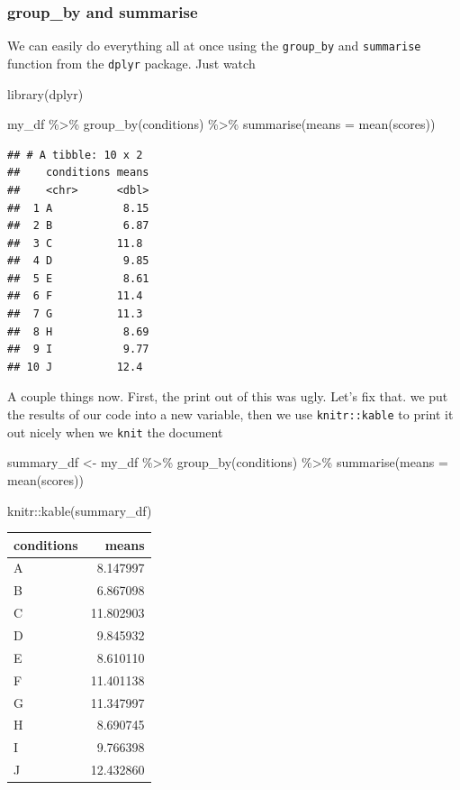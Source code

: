 \documentclass[
]{book}
\newenvironment{Shaded}{\begin{snugshade}}{\end{snugshade}}
\newcommand{\AttributeTok}[1]{\textcolor[rgb]{0.77,0.63,0.00}{#1}}
\newcommand{\FunctionTok}[1]{\textcolor[rgb]{0.00,0.00,0.00}{#1}}
\newcommand{\NormalTok}[1]{#1}
\newcommand{\OtherTok}[1]{\textcolor[rgb]{0.56,0.35,0.01}{#1}}
\newcommand{\SpecialCharTok}[1]{\textcolor[rgb]{0.00,0.00,0.00}{#1}}
\begin{document}
\hypertarget{group_by-and-summarise}{%
\subsubsection{group\_by and summarise}\label{group_by-and-summarise}}

We can easily do everything all at once using the \texttt{group\_by} and \texttt{summarise} function from the \texttt{dplyr} package. Just watch

\begin{Shaded}
\begin{Highlighting}[]
\FunctionTok{library}\NormalTok{(dplyr)}

\NormalTok{my\_df }\SpecialCharTok{\%\textgreater{}\%}
  \FunctionTok{group\_by}\NormalTok{(conditions) }\SpecialCharTok{\%\textgreater{}\%}
  \FunctionTok{summarise}\NormalTok{(}\AttributeTok{means =} \FunctionTok{mean}\NormalTok{(scores))}
\end{Highlighting}
\end{Shaded}

\begin{verbatim}
## # A tibble: 10 x 2
##    conditions means
##    <chr>      <dbl>
##  1 A           8.15
##  2 B           6.87
##  3 C          11.8 
##  4 D           9.85
##  5 E           8.61
##  6 F          11.4 
##  7 G          11.3 
##  8 H           8.69
##  9 I           9.77
## 10 J          12.4
\end{verbatim}

A couple things now. First, the print out of this was ugly. Let's fix that. we put the results of our code into a new variable, then we use \texttt{knitr::kable} to print it out nicely when we \texttt{knit} the document

\begin{Shaded}
\begin{Highlighting}[]
\NormalTok{summary\_df }\OtherTok{\textless{}{-}}\NormalTok{ my\_df }\SpecialCharTok{\%\textgreater{}\%}
               \FunctionTok{group\_by}\NormalTok{(conditions) }\SpecialCharTok{\%\textgreater{}\%}
               \FunctionTok{summarise}\NormalTok{(}\AttributeTok{means =} \FunctionTok{mean}\NormalTok{(scores))}

\NormalTok{knitr}\SpecialCharTok{::}\FunctionTok{kable}\NormalTok{(summary\_df)}
\end{Highlighting}
\end{Shaded}

\begin{tabular}{l|r}
\hline
conditions & means\\
\hline
A & 8.147997\\
\hline
B & 6.867098\\
\hline
C & 11.802903\\
\hline
D & 9.845932\\
\hline
E & 8.610110\\
\hline
F & 11.401138\\
\hline
G & 11.347997\\
\hline
H & 8.690745\\
\hline
I & 9.766398\\
\hline
J & 12.432860\\
\hline
\end{tabular}
\end{document}
